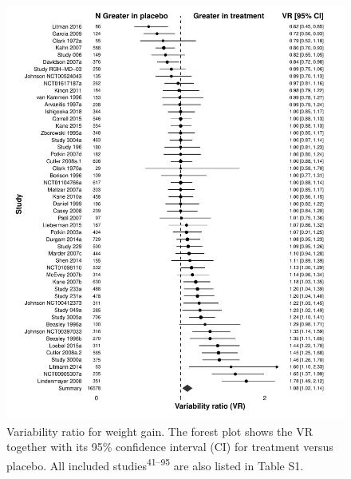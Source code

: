 \documentclass[
  9pt,
  english,
  ,jou,floatsintext]{apa6}
\begin{document}
\begin{figure}
\centering
\includegraphics{../output/figures/weightsd_fig1.pdf}
\caption{\label{fig:fig1}Variability ratio for weight gain. The forest
plot shows the VR together with its 95\% confidence interval (CI) for
treatment versus placebo. All included studies\textsuperscript{41--95}
are also listed in Table S1.}
\end{figure}
\end{document}
